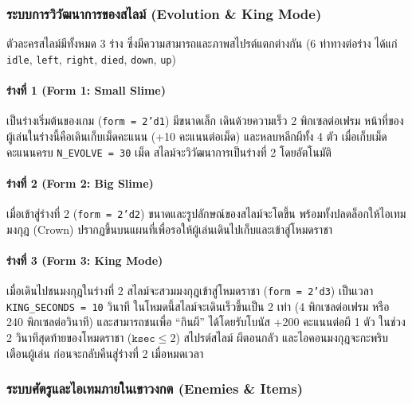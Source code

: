 \subsubsection{ระบบการวิวัฒนาการของสไลม์ (Evolution \& King Mode)}

ตัวละครสไลม์มีทั้งหมด 3 ร่าง ซึ่งมีความสามารถและภาพสไปรต์แตกต่างกัน (6 ท่าทางต่อร่าง ได้แก่ \texttt{idle}, \texttt{left}, \texttt{right}, \texttt{died}, \texttt{down}, \texttt{up})

\paragraph{ร่างที่ 1 (Form 1: Small Slime)}
เป็นร่างเริ่มต้นของเกม (\texttt{form = 2'd1}) มีขนาดเล็ก เดินด้วยความเร็ว 2 พิกเซลต่อเฟรม หน้าที่ของผู้เล่นในร่างนี้คือเดินเก็บเม็ดคะแนน (+10 คะแนนต่อเม็ด) และหลบหลีกผีทั้ง 4 ตัว เมื่อเก็บเม็ดคะแนนครบ \texttt{N\_EVOLVE = 30} เม็ด สไลม์จะวิวัฒนาการเป็นร่างที่ 2 โดยอัตโนมัติ

\paragraph{ร่างที่ 2 (Form 2: Big Slime)}
เมื่อเข้าสู่ร่างที่ 2 (\texttt{form = 2'd2}) ขนาดและรูปลักษณ์ของสไลม์จะโตขึ้น พร้อมทั้งปลดล็อกให้ไอเทมมงกุฎ (Crown) ปรากฏขึ้นบนแผนที่เพื่อรอให้ผู้เล่นเดินไปเก็บและเข้าสู่โหมดราชา

\paragraph{ร่างที่ 3 (Form 3: King Mode)}
เมื่อเดินไปชนมงกุฎในร่างที่ 2 สไลม์จะสวมมงกุฎเข้าสู่โหมดราชา (\texttt{form = 2'd3}) เป็นเวลา \texttt{KING\_SECONDS = 10} วินาที ในโหมดนี้สไลม์จะเดินเร็วขึ้นเป็น 2 เท่า (4 พิกเซลต่อเฟรม หรือ 240 พิกเซลต่อวินาที) และสามารถชนเพื่อ “กินผี” ได้โดยรับโบนัส +200 คะแนนต่อผี 1 ตัว ในช่วง 2 วินาทีสุดท้ายของโหมดราชา ($\texttt{ksec} \le 2$) สไปรต์สไลม์ ผีตอนกลัว และไอคอนมงกุฎจะกะพริบเตือนผู้เล่น ก่อนจะกลับคืนสู่ร่างที่ 2 เมื่อหมดเวลา

\subsubsection{ระบบศัตรูและไอเทมภายในเขาวงกต (Enemies \& Items)}

